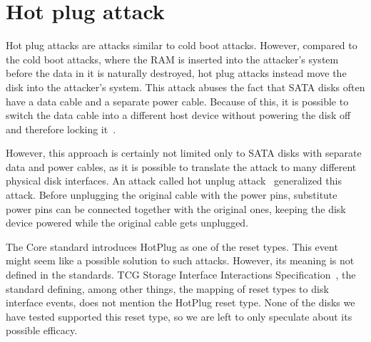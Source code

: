 \section{Hot plug attack}

Hot plug attacks are attacks similar to cold boot attacks. However, compared to the cold boot attacks, where the RAM is inserted into the attacker's system before the data in it is naturally destroyed, hot plug attacks instead move the disk into the attacker's system. This attack abuses the fact that SATA disks often have a data cable and a separate power cable. Because of this, it is possible to switch the data cable into a different host device without powering the disk off and therefore locking it~\cite{self_decrypting_risks}. 

However, this approach is certainly not limited only to SATA disks with separate data and power cables, as it is possible to translate the attack to many different physical disk interfaces. An attack called hot unplug attack~\cite{bypassing_in_enterprise} generalized this attack. 
Before unplugging the original cable with the power pins, substitute power pins can be connected together with the original ones, keeping the disk device powered while the original cable gets unplugged. 


\REPLACEME

The Core standard introduces HotPlug as one of the reset types. This event might seem like a possible solution to such attacks. However,  its meaning is not defined in the standards. TCG Storage Interface Interactions Specification~\cite{tcg-siis}, the standard defining, among other things, the mapping of reset types to disk interface events, does not mention the HotPlug reset type. None of the disks we have tested supported this reset type, so we are left to only speculate about its possible efficacy.






